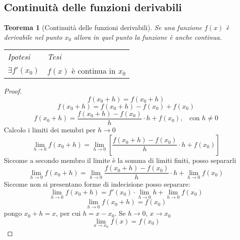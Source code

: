 \documentclass{article}     %
\newtheorem*{theorem}{Teorema}
\newenvironment{shadedTheorem}%
  {\begin{mdframed}[backgroundcolor=lightgray!40, linecolor=white, innertopmargin=4pt, innerbottommargin=13pt]\begin{theorem}}%
  {\end{theorem}\end{mdframed}}
\begin{document}
    \subsection{Continuità delle funzioni derivabili}
        \begin{shadedTheorem}[Continuità delle funzioni derivabili]
            Se una funzione $f(x)$ è derivabile nel punto $x_0$ allora in quel punto la funzione è anche continua.
        \end{shadedTheorem}
        \begin{tabular}{m{}m{}}
            \textit{Ipotesi} & \textit{Tesi}  \\
            $\exists f'(x_0)$ & $f(x)$ è continua in $x_0$
        \end{tabular}
        \begin{proof}
        \[f(x_0+h)=f(x_0+h)\]
        \[f(x_0+h)=f(x_0+h)-f(x_0)+f(x_0)\]
        \[f(x_0+h)=\frac{f(x_0+h)-f(x_0)}{h}\cdot h+f(x_0), ~~~~\text{con } h\neq 0\]
        Calcolo i limiti dei membri per $h \to 0$
        \[\lim_{h\to 0}f(x_0+h)=\lim_{h\to0}\left[\frac{f(x_0+h)-f(x_0)}{h}\cdot h+f(x_0)\right]\]
        Siccome a secondo membro il limite è la somma di limiti finiti, posso separarli
        \[\lim_{h\to 0}f(x_0+h)=\lim_{h\to0}\frac{f(x_0+h)-f(x_0)}{h}\cdot h+\lim_{h\to0}f(x_0)\]
        Siccome non si presentano forme di indecisione posso separare:
        \[\lim_{h\to 0}f(x_0+h)=f'(x_0)\cdot \lim_{h\to0} h+\lim_{h\to0}f(x_0)\]
        \[\lim_{h\to 0}f(x_0+h)=f(x_0)\]
        pongo $x_0+h = x$, per cui $h=x-x_0$. Se $h\to 0$, $x\to x_0$
        \[\lim_{x\to x_0}f(x) = f(x_0)\]
        \end{proof}
\end{document}
